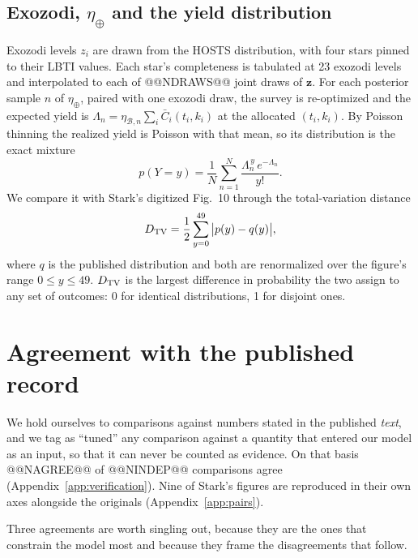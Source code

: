 \documentclass[11pt,a4paper]{article}
\begin{document}
\subsection{Exozodi, $\eta_\oplus$ and the yield distribution}
\label{sec:ydist}

Exozodi levels $z_i$ are drawn from the HOSTS distribution, with four stars pinned to their LBTI
values. Each star's completeness is tabulated at 23 exozodi levels and interpolated to each of
@@NDRAWS@@ joint draws of $\mathbf{z}$. For each posterior sample $n$ of $\eta_\oplus$, paired with
one exozodi draw, the survey is re-optimized and the expected yield is
$\Lambda_n = \eta_{\mathcal{B},n}\sum_i \bar C_i(t_i, k_i)$ at the allocated $(t_i, k_i)$. By
Poisson thinning the realized yield is Poisson with that mean, so its distribution is the exact
mixture
\begin{equation}
p(Y = y) = \frac{1}{N}\sum_{n=1}^{N} \frac{\Lambda_n^{\,y}\,e^{-\Lambda_n}}{y!}.
\label{eq:mixture}
\end{equation}
We compare it with Stark's digitized Fig.~10 through the total-variation distance
\begin{equation}
D_{\rm TV} = \frac{1}{2}\sum_{y=0}^{49}\big|p(y) - q(y)\big|,
\label{eq:dtv}
\end{equation}
where $q$ is the published distribution and both are renormalized over the figure's range
$0 \le y \le 49$. $D_{\rm TV}$ is the largest difference in probability the two assign to any set
of outcomes: 0 for identical distributions, 1 for disjoint ones.

\section{Agreement with the published record}
\label{sec:agreement}

We hold ourselves to comparisons against numbers stated in the published \emph{text}, and we tag
as ``tuned'' any comparison against a quantity that entered our model as an input, so that it can
never be counted as evidence. On that basis @@NAGREE@@ of @@NINDEP@@ comparisons agree
(Appendix~\ref{app:verification}). Nine of Stark's figures are reproduced in their own axes
alongside the originals (Appendix~\ref{app:pairs}).

Three agreements are worth singling out, because they are the ones that constrain the model most
and because they frame the disagreements that follow.
\end{document}
